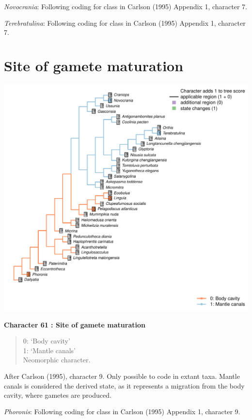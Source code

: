 \documentclass[]{book}
\theoremstyle{definition}
\theoremstyle{definition}
\theoremstyle{definition}
\theoremstyle{remark}
\begin{document}
\emph{Novocrania}: Following coding for class in Carlson (1995) Appendix
1, character 7.

\emph{Terebratulina}: Following coding for class in Carlson (1995)
Appendix 1, character 7.

\hypertarget{site-of-gamete-maturation}{%
\section*{Site of gamete maturation}\label{site-of-gamete-maturation}}

\includegraphics{Brachiopod_phylogeny_files/figure-latex/unnamed-chunk-5-61.pdf}

\textbf{Character 61 : Site of gamete maturation }

\begin{quote}
0: `Body cavity'\\
1: `Mantle canals'\\
Neomorphic character.
\end{quote}

After Carlson (1995), character 9. Only possible to code in extant taxa.
Mantle canals is considered the derived state, as it represents a
migration from the body cavity, where gametes are produced.

\emph{Phoronis}: Following coding for class in Carlson (1995) Appendix
1, character 9.
\end{document}

